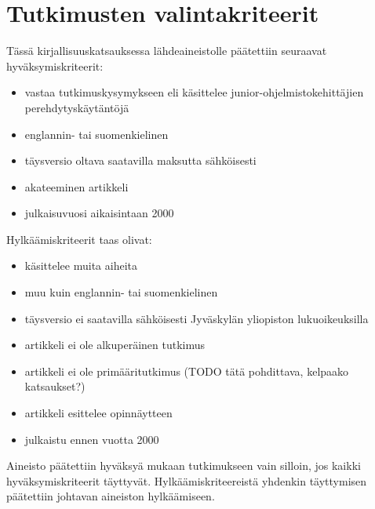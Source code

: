 \documentclass[utf8]{gradu3}
\begin{document}
\section{Tutkimusten valintakriteerit}

Tässä kirjallisuuskatsauksessa lähdeaineistolle päätettiin seuraavat hyväksymiskriteerit:

\begin{itemize}
    \item vastaa tutkimuskysymykseen eli käsittelee junior-ohjelmistokehittäjien perehdytyskäytäntöjä
    \item englannin- tai suomenkielinen
    \item täysversio oltava saatavilla maksutta sähköisesti
    \item akateeminen artikkeli
    \item julkaisuvuosi aikaisintaan 2000
\end{itemize}

Hylkäämiskriteerit taas olivat:

\begin{itemize}
    \item käsittelee muita aiheita
    \item muu kuin englannin- tai suomenkielinen
    \item täysversio ei saatavilla sähköisesti Jyväskylän yliopiston lukuoikeuksilla
    \item artikkeli ei ole alkuperäinen tutkimus
    \item artikkeli ei ole primääritutkimus (TODO tätä pohdittava, kelpaako katsaukset?)
    \item artikkeli esittelee opinnäytteen
    \item julkaistu ennen vuotta 2000
\end{itemize}

Aineisto päätettiin hyväksyä mukaan tutkimukseen vain silloin, jos kaikki hyväksymiskriteerit täyttyvät. Hylkäämiskriteereistä yhdenkin täyttymisen päätettiin johtavan aineiston hylkäämiseen.



\end{document}
